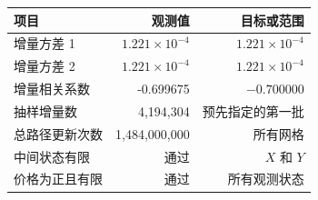 \begin{tabular}{lrr}\toprule 项目 & 观测值 & 目标或范围\\\midrule
增量方差 1 & $1.221\times10^{-4}$ & $1.221\times10^{-4}$\\
增量方差 2 & $1.221\times10^{-4}$ & $1.221\times10^{-4}$\\
增量相关系数 & -0.699675 & $-0.700000$\\
抽样增量数 & 4,194,304 & 预先指定的第一批\\
总路径更新次数 & 1,484,000,000 & 所有网格\\
中间状态有限 & 通过 & $X$ 和 $Y$\\
价格为正且有限 & 通过 & 所有观测状态\\
\bottomrule\end{tabular}
